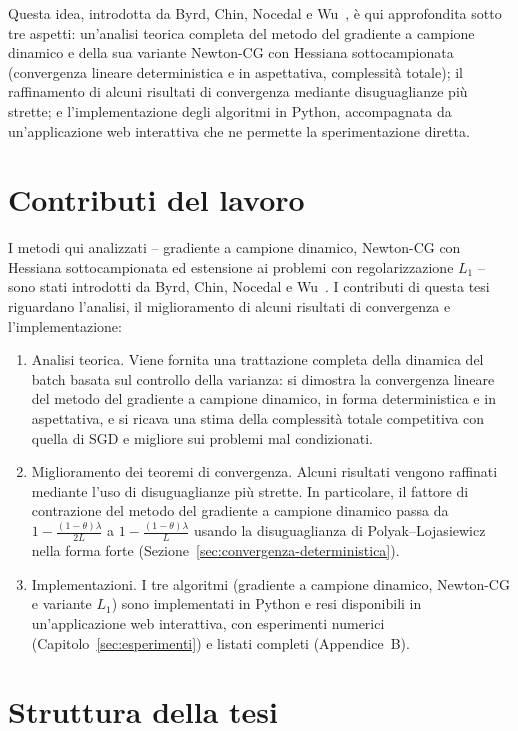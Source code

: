 \documentclass[italian, a4paper, twoside, binding=6mm]{sapthesis}
\begin{document}
Questa idea, introdotta da Byrd, Chin, Nocedal e Wu~\cite{byrd2012}, è qui
approfondita sotto tre aspetti: un'analisi teorica completa del metodo del
gradiente a campione dinamico e della sua variante Newton-CG con Hessiana
sottocampionata (convergenza lineare deterministica e in aspettativa,
complessità totale); il raffinamento di alcuni risultati di convergenza
mediante disuguaglianze più strette; e l'implementazione degli algoritmi in
Python, accompagnata da un'applicazione web interattiva che ne permette la
sperimentazione diretta.

\section{Contributi del lavoro}

I metodi qui analizzati -- gradiente a campione dinamico, Newton-CG con
Hessiana sottocampionata ed estensione ai problemi con regolarizzazione
$L_1$ -- sono stati introdotti da Byrd, Chin, Nocedal e Wu~\cite{byrd2012}.
I contributi di questa tesi riguardano l'analisi, il miglioramento di alcuni
risultati di convergenza e l'implementazione:

\begin{enumerate}
  \item Analisi teorica. Viene fornita una trattazione completa della
  dinamica del batch basata sul controllo della varianza: si dimostra la
  convergenza lineare del metodo del gradiente a campione dinamico, in forma
  deterministica e in aspettativa, e si ricava una stima della complessità
  totale competitiva con quella di SGD e migliore sui problemi mal
  condizionati.
  \item Miglioramento dei teoremi di convergenza. Alcuni risultati
  vengono raffinati mediante l'uso di disuguaglianze più strette. In
  particolare, il fattore di contrazione del metodo del gradiente a campione
  dinamico passa da $1-\frac{(1-\theta)\lambda}{2L}$ a
  $1-\frac{(1-\theta)\lambda}{L}$ usando la disuguaglianza di
  Polyak--Lojasiewicz nella forma forte
  (Sezione~\ref{sec:convergenza-deterministica}).
  \item Implementazioni. I tre algoritmi (gradiente a campione
  dinamico, Newton-CG e variante $L_1$) sono implementati in Python e resi
  disponibili in un'applicazione web interattiva, con esperimenti numerici
  (Capitolo~\ref{sec:esperimenti}) e listati completi (Appendice~B).
\end{enumerate}

\section{Struttura della tesi}
\end{document}
